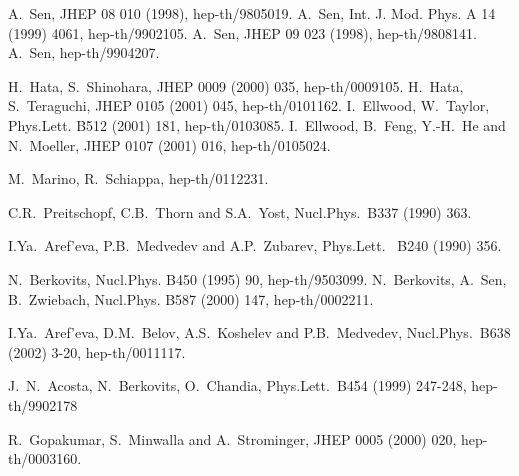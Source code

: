 \documentclass[a4paper,12pt]{article}
\begin{document}
{\begin{thebibliography}{99}
 A.~Sen,
 JHEP 08 010 (1998),
hep-th/9805019.
A.~Sen,  Int. J. Mod. Phys. A 14 (1999) 4061, hep-th/9902105.
A.~Sen,
JHEP 09 023 (1998), hep-th/9808141.
A.~Sen,
hep-th/9904207.

 H.~Hata, S.~Shinohara,
  JHEP 0009 (2000) 035, hep-th/0009105.
H.~Hata, S.~Teraguchi,
 JHEP 0105 (2001) 045,
hep-th/0101162.
I.~Ellwood, W.~Taylor,
 Phys.Lett.
B512 (2001) 181, hep-th/0103085.
I.~Ellwood, B.~Feng, Y.-H.~He and N.~Moeller,
 JHEP
0107 (2001) 016, hep-th/0105024.



 M.~Marino, R.~Schiappa,
 hep-th/0112231.



 C.R.~Preitschopf, C.B.~Thorn and S.A.~Yost,
 Nucl.Phys.~B337 (1990) 363.

 I.Ya.~Aref'eva,  P.B.~Medvedev and A.P.~Zubarev,
Phys.Lett.~ B240 (1990) 356.


 N.~Berkovits,                                                              
 Nucl.Phys. B450 (1995) 90,
hep-th/9503099.
N.~Berkovits, A.~Sen, B.~Zwiebach,
 Nucl.Phys. B587 (2000) 147,
hep-th/0002211.



 I.Ya.~Aref'eva, D.M.~Belov, A.S.~Koshelev and P.B.~Medvedev,
Nucl.Phys.~B638 (2002) 3-20, hep-th/0011117.

 J.~N.~Acosta, N.~Berkovits, O.~Chandia,
Phys.Lett.~B454 (1999) 247-248,
hep-th/9902178

 R.~Gopakumar, S.~Minwalla and A.~Strominger,
 JHEP 0005 (2000) 020,
hep-th/0003160.

\end{thebibliography}
}
\end{document}
